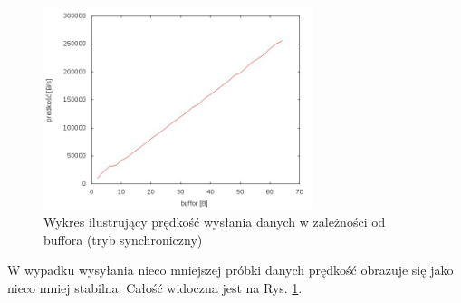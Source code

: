 \documentclass{BscUS}
\begin{document}
\begin{figure}[H]
{
\centering
\includegraphics[width=0.7\textwidth]{./img/S_10737420Send}
\caption{Wykres ilustrujący prędkość wysłania danych w zależności od buffora (tryb synchroniczny)}
\label{fig:S_10737420Send}
}
\end{figure}
\noindent W wypadku wysyłania nieco mniejszej próbki danych prędkość obrazuje się jako nieco mniej stabilna. Całość widoczna jest na Rys. \ref{fig:S_10737420Send}.
\end{document}
